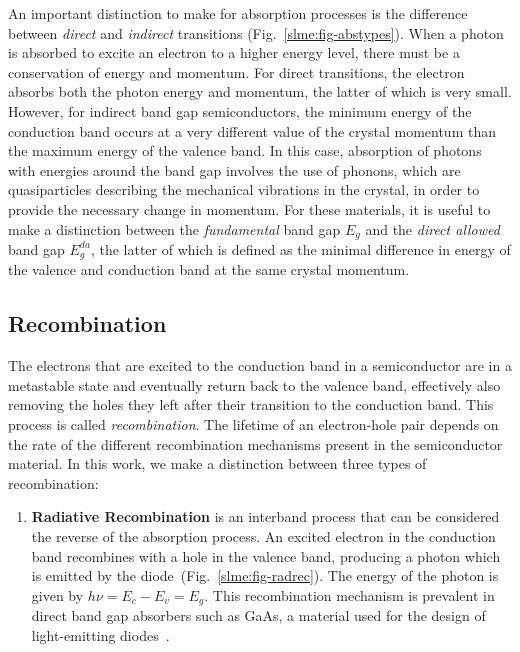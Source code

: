 \begin{refsection}
An important distinction to make for absorption processes is the difference 
between \textit{direct} and \textit{indirect} transitions 
(Fig.~\ref{slme:fig-abstypes}). When a photon is absorbed to excite an 
electron to a higher energy level, there must be a conservation of energy and 
momentum. For direct transitions, the electron absorbs both the photon energy 
and momentum, the latter of which is very small. However, for indirect band 
gap semiconductors, the minimum energy of the conduction band occurs at a very 
different value of the crystal momentum than the maximum energy of the valence 
band. In this case, absorption of photons with energies around the band gap 
involves the use of phonons, which are quasiparticles describing the 
mechanical vibrations in the crystal, in order to provide the necessary change 
in momentum. For these materials, it is useful to make a distinction between 
the \textit{fundamental} band gap $E_g$ and the \textit{direct allowed} band 
gap $E_g^{da}$, the latter of which is defined as the minimal difference in 
energy of the valence and conduction band at the same crystal momentum. 
 
\subsection{Recombination}\label{slme:sec-recombination} 
 
The electrons that are excited to the conduction band in a semiconductor are 
in a metastable state and eventually return back to the valence band, 
effectively also removing the holes they left after their transition to the 
conduction band. This process is called \textit{recombination}. The lifetime 
of an electron-hole pair depends on the rate of the different recombination 
mechanisms present in the semiconductor material. In this work, we make a 
distinction between three types of recombination: 
 
\begin{enumerate}[] 
 
	\item\textbf{Radiative Recombination} is an interband process that can be 
considered the reverse of the absorption process. An excited electron in the 
conduction band recombines with a hole in the valence band, producing a photon 
which is emitted by the diode~(Fig.~\ref{slme:fig-radrec}). The energy of the 
photon is given by $h \nu = E_c - E_v = E_g$. This recombination mechanism is 
prevalent in direct band gap absorbers such as GaAs, a material used for the 
design of light-emitting diodes~\cite{Green1981}. 
 

\end{enumerate}
\end{refsection}

